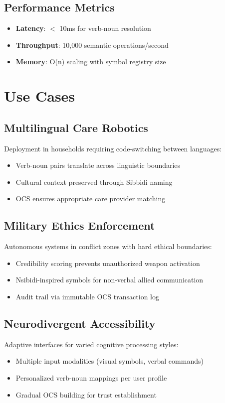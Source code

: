\documentclass[12pt,a4paper]{article}
\begin{document}
\subsection{Performance Metrics}
\begin{itemize}
    \item \textbf{Latency}: $<$ 10ms for verb-noun resolution
    \item \textbf{Throughput}: 10,000 semantic operations/second
    \item \textbf{Memory}: O(n) scaling with symbol registry size
\end{itemize}

\section{Use Cases}

\subsection{Multilingual Care Robotics}
Deployment in households requiring code-switching between languages:
\begin{itemize}
    \item Verb-noun pairs translate across linguistic boundaries
    \item Cultural context preserved through Sibbidi naming
    \item OCS ensures appropriate care provider matching
\end{itemize}

\subsection{Military Ethics Enforcement}
Autonomous systems in conflict zones with hard ethical boundaries:
\begin{itemize}
    \item Credibility scoring prevents unauthorized weapon activation
    \item Nsibidi-inspired symbols for non-verbal allied communication
    \item Audit trail via immutable OCS transaction log
\end{itemize}

\subsection{Neurodivergent Accessibility}
Adaptive interfaces for varied cognitive processing styles:
\begin{itemize}
    \item Multiple input modalities (visual symbols, verbal commands)
    \item Personalized verb-noun mappings per user profile
    \item Gradual OCS building for trust establishment
\end{itemize}
\end{document}
